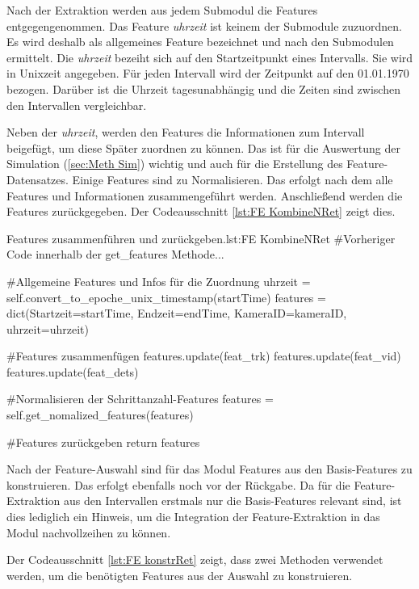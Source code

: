 Nach der Extraktion werden aus jedem Submodul die Features entgegengenommen. Das Feature \textit{uhrzeit} ist keinem der Submodule zuzuordnen. Es wird deshalb als allgemeines Feature bezeichnet und nach den Submodulen ermittelt. Die \textit{uhrzeit} bezeiht sich auf den Startzeitpunkt eines Intervalls. Sie wird in Unixzeit angegeben. Für jeden Intervall wird der Zeitpunkt auf den 01.01.1970 bezogen. Darüber ist die Uhrzeit tagesunabhängig und die Zeiten sind zwischen den Intervallen vergleichbar. \par

Neben der \textit{uhrzeit}, werden den Features die Informationen zum Intervall beigefügt, um diese Später zuordnen zu können. Das ist für die Auswertung der Simulation (\ref{sec:Meth Sim}) wichtig und auch für die Erstellung des Feature-Datensatzes. Einige Features sind zu Normalisieren. Das erfolgt nach dem alle Features und Informationen zusammengeführt werden. Anschließend werden die Features zurückgegeben. Der Codeausschnitt \ref{lst:FE KombineNRet} zeigt dies.

\begin{pythoncode}{Features zusammenführen und zurückgeben.}{lst:FE KombineNRet}
#Vorheriger Code innerhalb der get_features Methode...

#Allgemeine Features und Infos für die Zuordnung
uhrzeit = self.convert_to_epoche_unix_timestamp(startTime)
features = dict(Startzeit=startTime, 
                Endzeit=endTime, 
                KameraID=kameraID, 
                uhrzeit=uhrzeit)

#Features zusammenfügen
features.update(feat_trk)
features.update(feat_vid)
features.update(feat_dets)

#Normalisieren der Schrittanzahl-Features 
features = self.get_nomalized_features(features)

#Features zurückgeben
return features
\end{pythoncode}

Nach der Feature-Auswahl sind für das Modul Features aus den Basis-Features zu konstruieren. Das erfolgt ebenfalls noch vor der Rückgabe. Da für die Feature-Extraktion aus den Intervallen erstmals nur die Basis-Features relevant sind, ist dies lediglich ein Hinweis, um die Integration der Feature-Extraktion in das Modul nachvollzeihen zu können. \par

Der Codeausschnitt \ref{lst:FE konstrRet} zeigt, dass zwei Methoden verwendet werden, um die benötigten Features aus der Auswahl zu konstruieren. 

